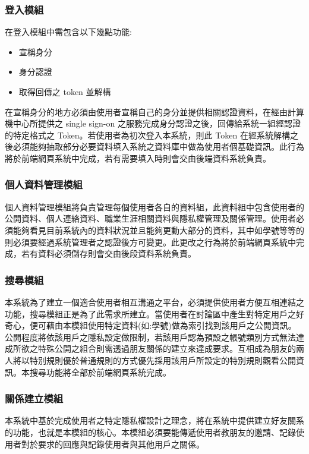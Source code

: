 \documentclass[11pt]{article}
\begin{document}
\subsubsection{登入模組}
在登入模組中需包含以下幾點功能: 
\begin{itemize}
\item{宣稱身分}
\item{身分認證}
\item{取得回傳之 token 並解構}
\end{itemize}
在宣稱身分的地方必須由使用者宣稱自己的身分並提供相關認證資料，在經由計算機中心所提供之 single sign-on 之服務完成身分認證之後，回傳給系統一組經認證的特定格式之 Token。若使用者為初次登入本系統，則此 Token 在經系統解構之後必須能夠抽取部分必要資料填入系統之資料庫中做為使用者個基礎資訊。此行為將於前端網頁系統中完成，若有需要填入時則會交由後端資料系統負責。

\subsubsection{個人資料管理模組}
個人資料管理模組將負責管理每個使用者各自的資料組，此資料組中包含使用者的公開資料、個人連絡資料、職業生涯相關資料與隱私權管理及關係管理。使用者必須能夠看見目前系統內的資料狀況並且能夠更動大部分的資料，其中如學號等等的則必須要經過系統管理者之認證後方可變更。此更改之行為將於前端網頁系統中完成，若有資料必須儲存則會交由後段資料系統負責。

\subsubsection{搜尋模組}
本系統為了建立一個適合使用者相互溝通之平台，必須提供使用者方便互相連結之功能，搜尋模組正是為了此需求所建立。當使用者在討論區中產生對特定用戶之好奇心，便可藉由本模組使用特定資料(如:學號)做為索引找到該用戶之公開資訊。公開程度將依該用戶之隱私設定做限制，若該用戶認為預設之帳號類別方式無法達成所欲之特殊公開之組合則需透過朋友關係的建立來達成要求。互相成為朋友的兩人將以特別規則優於普通規則的方式優先採用該用戶所設定的特別規則觀看公開資訊。本搜尋功能將全部於前端網頁系統完成。

\subsubsection{關係建立模組}
本系統中基於完成使用者之特定隱私權設計之理念，將在系統中提供建立好友關系的功能，也就是本模組的核心。本模組必須要能傳遞使用者教朋友的邀請、記錄使用者對於要求的回應與記錄使用者與其他用戶之關係。
\end{document}
